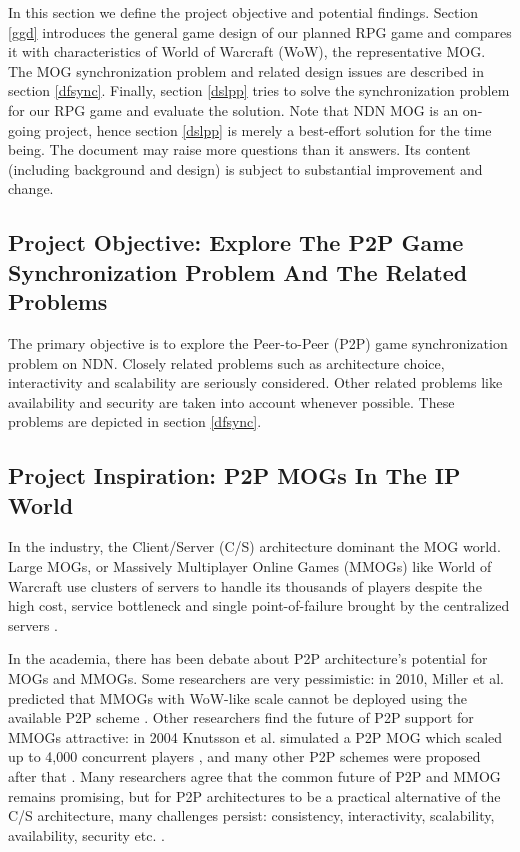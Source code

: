 \documentclass{article}
\begin{document}
In this section we define the project objective and potential findings. Section \ref{ggd} introduces the general game design of our planned RPG game and compares it with characteristics of World of Warcraft (WoW), the representative MOG. The MOG synchronization problem and related design issues are described in section \ref{dfsync}. Finally, section \ref{dslpp} tries to solve the synchronization problem for our RPG game and evaluate the solution. Note that NDN MOG is an on-going project, hence section \ref{dslpp} is merely a best-effort solution for the time being. The document may raise more questions than it answers. Its content (including background and design) is subject to substantial improvement and change.

\subsection{Project Objective: Explore The P2P Game Synchronization Problem And The Related Problems}
The primary objective is to explore the Peer-to-Peer (P2P) game synchronization problem on NDN. Closely related problems such as architecture choice, interactivity and scalability are seriously considered. Other related problems like availability and security are taken into account whenever possible. These problems are depicted in section \ref{dfsync}.

\subsection{Project Inspiration: P2P MOGs In The IP World}
In the industry, the Client/Server (C/S) architecture dominant the MOG world. Large MOGs, or Massively Multiplayer Online Games (MMOGs) like World of Warcraft use clusters of servers to handle its thousands of players despite the high cost, service bottleneck and single point-of-failure brought by the centralized servers \cite{Neumann07, Fan10}. 

In the academia, there has been debate about P2P architecture's potential for MOGs and MMOGs. Some researchers are very pessimistic: in 2010, Miller et al. predicted that MMOGs with WoW-like scale cannot be deployed using the available P2P scheme \cite{Miller10}. Other researchers find the future of P2P support for MMOGs attractive: in 2004 Knutsson et al. simulated a P2P MOG which scaled up to 4,000 concurrent players \cite{Knutsson04}, and many other P2P schemes were proposed after that \cite{Fan10}. Many researchers agree that the common future of P2P and MMOG remains promising, but for P2P architectures to be a practical alternative of the C/S architecture, many challenges persist: consistency, interactivity, scalability, availability, security etc. \cite{Neumann07, Fan10, Gilmore12}. 
\end{document}
